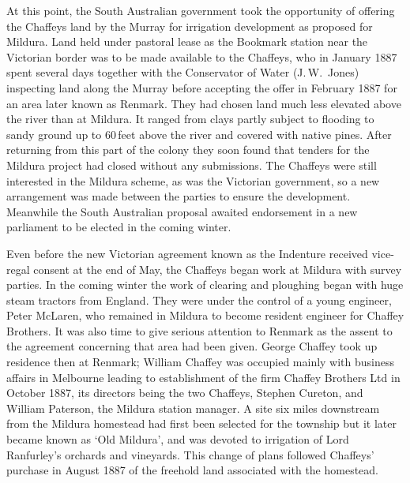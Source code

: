 At this point, the South Australian government took the opportunity of
offering the Chaffeys land by the Murray for irrigation development as
proposed for Mildura.  Land held under pastoral lease as the Bookmark
station  near the Victorian border was to be
made available to the Chaffeys, who in January 1887 spent several days
together with the Conservator of Water (J.\,W.~Jones)  inspecting land along the Murray before accepting the offer in
February 1887 for an area later known as Renmark. 
They had chosen land much less elevated above the river than at
Mildura.  It ranged from clays partly subject to flooding to sandy
ground up to 60\,feet above the river and covered with native pines.
After returning from this part of the colony they soon found that
tenders for the Mildura  project had closed
without any submissions.  The Chaffeys were still interested in the
Mildura scheme, as was the Victorian government, so a new arrangement
was made between the parties to ensure the development.  Meanwhile the
South Australian proposal awaited endorsement in a new parliament to
be elected in the coming winter.

Even before the new Victorian agreement known as the Indenture
received vice-regal consent at the end of May, the Chaffeys began work
at Mildura with survey parties.  In the coming winter the work of
clearing and ploughing began with huge steam tractors from England.
They were under the control of a young engineer, Peter McLaren,
 who
remained in Mildura to become resident engineer for Chaffey Brothers.
It was also time to give serious attention to Renmark as the assent to
the agreement concerning that area had been given.  George Chaffey
took up residence then at Renmark; William Chaffey was occupied mainly
with business affairs in Melbourne leading to establishment of the
firm Chaffey Brothers Ltd in October 1887, its directors being the two
Chaffeys, Stephen Cureton, \index{Cureton, S.} and William Paterson,
\index{Paterson, W.} the Mildura station
manager.  A site six miles downstream from the Mildura homestead had
first been selected for the township but it later became known as `Old
Mildura', and was devoted to irrigation of Lord Ranfurley's
 orchards
and vineyards.  This change of plans followed Chaffeys' purchase in
August 1887 of the freehold land associated with the homestead.

